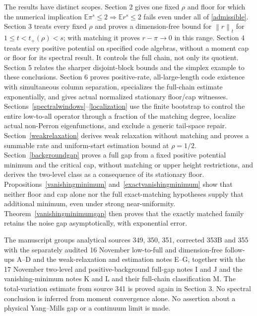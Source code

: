 \documentclass[11pt]{article}
\newcommand{\E}{\mathbb E}
\newcommand{\norm}[1]{\left\|#1\right\|}
\begin{document}
The results have distinct scopes. Section 2 gives one fixed $\rho$ and floor for which the numerical implication $\E\pi^s\leq2\Rightarrow\E r^s\leq2$ fails even under all of \eqref{admissible}. Section 3 treats every fixed $\rho$ and proves a dimension-free bound for $\norm r_t$ for $1\leq t<t_+(\rho)<s$; with matching it proves $r-\pi\to0$ in this range. Section 4 treats every positive potential on specified code algebras, without a moment cap or floor for its spectral result. It controls the full chain, not only its quotient. Section 5 relates the sharper disjoint-block bounds and the simplex example to these conclusions. Section 6 proves positive-rate, all-large-length code existence with simultaneous column separation, specializes the full-chain estimate exponentially, and gives actual normalized stationary floor/cap witnesses. Sections~\ref{spectralwindows}--\ref{localization} use the finite bootstrap to control the entire low-to-all operator through a fraction of the matching degree, localize actual non-Perron eigenfunctions, and exclude a generic tail-space repair. Section~\ref{weakrelaxation} derives weak relaxation without matching and proves a summable rate and uniform-start estimation bound at $\rho=1/2$. Section~\ref{backgroundgap} proves a full gap from a fixed positive potential minimum and the critical cap, without matching or upper height restrictions, and derives the two-level class as a consequence of its stationary floor. Propositions~\ref{vanishingminimum} and~\ref{exactvanishingminimum} show that neither floor and cap alone nor the full exact-matching hypotheses supply that additional minimum, even under strong near-uniformity. Theorem~\ref{vanishingminimumgap} then proves that the exactly matched family retains the noise gap asymptotically, with exponential error.

The manuscript groups analytical sources 349, 350, 351, corrected 353B and 355 with the separately audited 16 November low-to-full and dimension-free follow-ups A--D and the weak-relaxation and estimation notes E--G, together with the 17 November two-level and positive-background full-gap notes I and J and the vanishing-minimum notes K and L and their full-chain classification M. The total-variation estimate from source 341 is proved again in Section 3. No spectral conclusion is inferred from moment convergence alone. No assertion about a physical Yang--Mills gap or a continuum limit is made.
\end{document}
